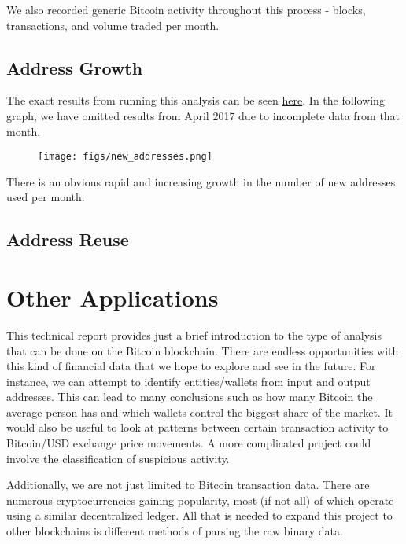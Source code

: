 \documentclass[9pt,twocolumn,twoside]{idsi}
\begin{document}
We also recorded generic Bitcoin activity throughout this process - blocks, transactions, and volume traded per month.

\subsection{Address Growth}

The exact results from running this analysis can be seen \href{https://github.com/nishilshah17/idsi_bitcoin/blob/d2f1e0257ff684e99356de052eed1c6868ffe82f/data/output/new_addresses/new_addresses.txt}{here}. In the following graph, we have omitted results from April 2017 due to incomplete data from that month.

\begin{figure}[!ht]
\texttt{[image: figs/new\_addresses.png]}
\end{figure}

There is an obvious rapid and increasing growth in the number of new addresses used per month.

\subsection{Address Reuse}



\section{Other Applications}
This technical report provides just a brief introduction to the type of analysis that can be done on the Bitcoin blockchain. There are endless opportunities with this kind of financial data that we hope to explore and see in the future. For instance, we can attempt to identify entities/wallets from input and output addresses. This can lead to many conclusions such as how many Bitcoin the average person has and which wallets control the biggest share of the market. It would also be useful to look at patterns between certain transaction activity to Bitcoin/USD exchange price movements. A more complicated project could involve the classification of suspicious activity.


Additionally, we are not just limited to Bitcoin transaction data. There are numerous cryptocurrencies gaining popularity, most (if not all) of which operate using a similar decentralized ledger. All that is needed to expand this project to other blockchains is different methods of parsing the raw binary data.
\end{document}
